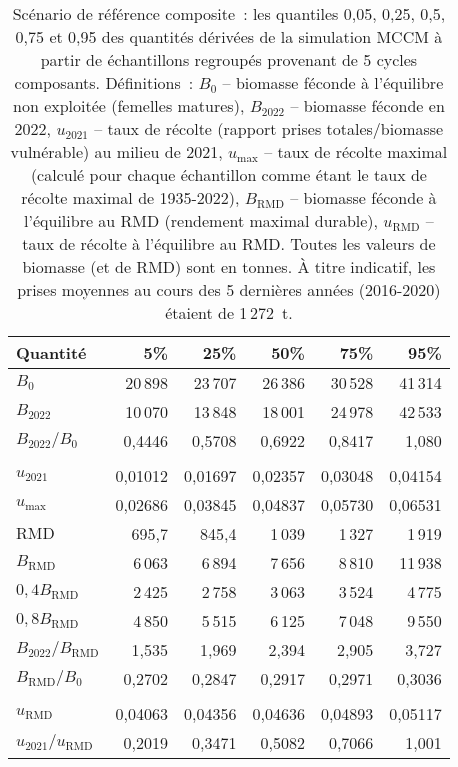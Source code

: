 \documentclass[11pt]{book}
\newcommand{\Bmsy}{B_\text{RMD}}
\newcommand{\umsy}{u_\text{RMD}}
\begin{document}
\begin{table}[ht]
\centering
\caption{Sc\'{e}nario de r\'{e}f\'{e}rence composite~: les quantiles 0,05, 0,25, 0,5, 0,75 et 0,95 des quantit\'{e}s d\'{e}riv\'{e}es de la simulation MCCM \`{a} partir de \Nbase \'{e}chantillons regroup\'{e}s provenant de 5 cycles composants. D\'{e}finitions~: $B_0$ -- biomasse f\'{e}conde \`{a} l'\'{e}quilibre non exploit\'{e}e  (femelles matures), $B_{2022}$ -- biomasse f\'{e}conde en 2022, $u_{2021}$ -- taux de r\'{e}colte (rapport prises totales/biomasse vuln\'{e}rable) au milieu de 2021, $u_\text{max}$ -- taux de r\'{e}colte maximal (calcul\'{e} pour chaque \'{e}chantillon comme \'{e}tant le taux de r\'{e}colte maximal de 1935-2022), $\Bmsy$ -- biomasse f\'{e}conde \`{a} l'\'{e}quilibre au RMD (rendement maximal durable), $\umsy$ -- taux de r\'{e}colte \`{a} l'\'{e}quilibre au RMD. Toutes les valeurs de biomasse (et de RMD) sont en tonnes. \`{A} titre indicatif, les prises moyennes au cours des 5 derni\`{e}res ann\'{e}es (2016-2020) \'{e}taient de 1\,272~t.} 
\label{tab:ymr.base.rfpt}
\begin{tabular}{lrrrrr}
  \\[-1.0ex] \hline
Quantit\'{e} & 5\% & 25\% & 50\% & 75\% & 95\% \\ 
  \hline
$B_{0}$ & 20\,898 & 23\,707 & 26\,386 & 30\,528 & 41\,314 \\ 
  $B_{2022}$ & 10\,070 & 13\,848 & 18\,001 & 24\,978 & 42\,533 \\ 
  $B_{2022}/B_{0}$ & 0,4446 & 0,5708 & 0,6922 & 0,8417 & 1,080 \\ 
   \hdashline \\[-1.75ex]$u_{2021}$ & 0,01012 & 0,01697 & 0,02357 & 0,03048 & 0,04154 \\ 
  $u_\text{max}$ & 0,02686 & 0,03845 & 0,04837 & 0,05730 & 0,06531 \\ 
   \hline
$\text{RMD}$ & 695,7 & 845,4 & 1\,039 & 1\,327 & 1\,919 \\ 
  $\Bmsy$ & 6\,063 & 6\,894 & 7\,656 & 8\,810 & 11\,938 \\ 
  $0,4\Bmsy$ & 2\,425 & 2\,758 & 3\,063 & 3\,524 & 4\,775 \\ 
  $0,8\Bmsy$ & 4\,850 & 5\,515 & 6\,125 & 7\,048 & 9\,550 \\ 
  $B_{2022}/\Bmsy$ & 1,535 & 1,969 & 2,394 & 2,905 & 3,727 \\ 
  $\Bmsy/B_{0}$ & 0,2702 & 0,2847 & 0,2917 & 0,2971 & 0,3036 \\ 
   \hdashline \\[-1.75ex]$\umsy$ & 0,04063 & 0,04356 & 0,04636 & 0,04893 & 0,05117 \\ 
  $u_{2021}/\umsy$ & 0,2019 & 0,3471 & 0,5082 & 0,7066 & 1,001 \\ 
   \hline
\end{tabular}
\end{table}
\setlength{\tabcolsep}{2pt}
\begin{landscapepage}{


}{\LH}{\RH}{\LF}{\RF} \end{landscapepage}
\end{document}
